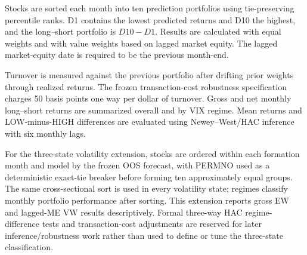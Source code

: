 Stocks are sorted each month into ten prediction portfolios using tie-preserving percentile ranks. D1 contains the lowest predicted returns and D10 the highest, and the long--short portfolio is $D10-D1$. Results are calculated with equal weights and with value weights based on lagged market equity. The lagged market-equity date is required to be the previous month-end.

Turnover is measured against the previous portfolio after drifting prior weights through realized returns. The frozen transaction-cost robustness specification charges 50 basis points one way per dollar of turnover. Gross and net monthly long--short returns are summarized overall and by VIX regime. Mean returns and LOW-minus-HIGH differences are evaluated using Newey--West/HAC inference with six monthly lags.


For the three-state volatility extension, stocks are ordered within each formation month and model by the frozen OOS forecast, with PERMNO used as a deterministic exact-tie breaker before forming ten approximately equal groups. The same cross-sectional sort is used in every volatility state; regimes classify monthly portfolio performance after sorting. This extension reports gross EW and lagged-ME VW results descriptively. Formal three-way HAC regime-difference tests and transaction-cost adjustments are reserved for later inference/robustness work rather than used to define or tune the three-state classification.
